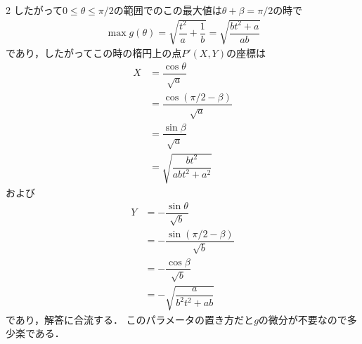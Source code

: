 \documentclass[../../main.tex]{subfiles}
\begin{document}
\begin{multicols}{2}
  したがって$0 \le \theta \le \pi/2$の範囲でのこの最大値は$\theta + \beta = \pi/2$の時で
  \begin{align}
    \max g(\theta) = \sqrt{\dfrac{t^2}{a}+\dfrac{1}{b}} = \sqrt{\dfrac{bt^2+a}{ab}}
  \end{align}
  であり，したがってこの時の楕円上の点$P'(X,Y)$の座標は
  \begin{align}
    X
    & = \dfrac{\cos\theta}{\sqrt{a}}        \\
    & = \dfrac{\cos(\pi/2-\beta)}{\sqrt{a}} \\
    & = \dfrac{\sin\beta}{\sqrt{a}}         \\
    & = \sqrt{\dfrac{bt^2}{abt^2+a^2}}
  \end{align}
  および
  \begin{align}
    Y
    & =  -\dfrac{\sin\theta}{\sqrt{b}}        \\
    & =  -\dfrac{\sin(\pi/2-\beta)}{\sqrt{b}} \\
    & =  -\dfrac{\cos\beta}{\sqrt{b}}         \\
    & =  -\sqrt{\dfrac{a}{b^2t^2+ab}}
  \end{align}
  であり，解答に合流する．
  このパラメータの置き方だと$g$の微分が不要なので多少楽である．

  \newpage
\end{multicols}
\end{document}
